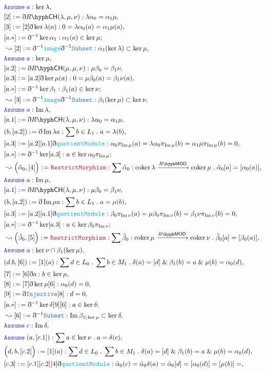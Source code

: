 \documentclass[12pt]{scrartcl}
\newcommand{\TYPE}[1]{\textcolor{NavyBlue}{\mathtt{#1}}}
\newcommand{\FUNC}[1]{\textcolor{Cerulean}{\mathtt{#1}}}
\newcommand{\LOGIC}[1]{\textcolor{Blue}{\mathtt{#1}}}
\newcommand{\THM}[1]{\textcolor{Maroon}{\mathtt{#1}}}
\renewcommand{\.}{\; . \;}
\newcommand{\de}{: \kern 0.1pc =}
\newcommand{\Page}[1]{ \begin{align*} #1 \end{align*}   }
\newcommand{ \bd }{ \ByDef }
\renewcommand{\And}{\; \& \;}
\DeclareMathOperator*{\im}{Im}
\newcommand{\Say}[3]{& #1 \de #2 : #3, \\}
\newcommand{\Conclude}[3]{& #1 \de #2 : #3; \\}
\newcommand{\Derive}[3]{& \leadsto #1 \de #2 : #3, \\}
\newcommand{\Assume}[2]{& \LOGIC{Assume} \; #1 : #2, \\}
\newcommand{\ByDef}{\eth}
\newcommand{\Arrow}[1]{\xrightarrow{#1}}
\DeclareMathOperator{\coker}{coker}
\newcommand{\LMOD}[1]{#1\hyph\mathsf{MOD}}
\newcommand{\CH}[1]{#1\hyph\mathsf{CH}}
\begin{document}
\Page{
	\Assume{a}{\ker \lambda}
	\Say{[2]}{\bd \CH{R}(\lambda,\mu,\nu)}{  \lambda \alpha_0 = \alpha_1 \mu  }
	\Say{[3]}{[2]\bd \ker \lambda (a)}{ 0 = \lambda \alpha_0(a) = \alpha_1 \mu(a)}
	\Conclude{[a.*]}{\bd^{-1}\ker \alpha_1}{ \alpha_1(a) \in \ker \mu}
	\Derive{[2]}{\bd^{-1}\FUNC{image}\bd^{-1}\TYPE{Subset}}{\alpha_1(\ker \lambda) \subset \ker \mu}
	\Assume{a}{\ker \mu}
	\Say{[a.2]}{\bd \CH{R}(\mu,\mu,\nu)}{  \mu \beta_0 = \beta_1 \nu  }
	\Say{[a.3]}{[a.2]\bd \ker \mu (a)}{ 0 = \mu \beta_0(a) = \beta_1 \nu(a)}
	\Conclude{[a.*]}{\bd^{-1}\ker \beta_1}{ \beta_1(a) \in \ker \nu}
	\Derive{[3]}{\bd^{-1}\FUNC{image}\bd^{-1}\TYPE{Subset}}{\beta_1(\ker \mu) \subset \ker \nu}
	\Assume{a}{\im \lambda}
	\Say{[a.1]}{\bd \CH{R}(\lambda,\mu,\nu)}{  \lambda \alpha_0 = \alpha_1 \mu  }
	\Say{(b,[a.2])}{\bd \im \lambda a}{\sum b \in L_1 \. a = \lambda(b) }
	\Say{[a.3]}{ [a.2][a.1] \bd \FUNC{quotientModule} }{ \alpha_0\pi_{\im \mu}(a) =  \lambda \alpha_0 \pi_{\im \mu}(b) =  \alpha_1 \mu \pi_{\im \mu}(b) = 0  }
	\Conclude{[a.*]}{\bd^{-1}\ker [a.3]}{ a \in \ker \alpha_0\pi_{\im \mu} }
	\Derive{\Big(\hat\alpha_0,[4]\Big)}{\THM{RestrictMorphism}}{\sum \hat \alpha_0 : \coker \lambda \Arrow{\LMOD{R}} \coker \mu \. \hat \alpha_0 [a] = [\alpha_0(a)]}
	\Assume{a}{\im \mu}
	\Say{[a.1]}{\bd \CH{R}(\lambda,\mu,\nu)}{  \mu \beta_0 = \beta_1 \nu  }
	\Say{(b,[a.2])}{\bd \im \mu a}{\sum b \in L_1 \. a = \mu(b) }
	\Say{[a.3]}{ [a.2][a.1] \bd \FUNC{quotientModule} }{ \beta_0\pi_{\im \nu}(a) =  \mu \beta_0 \pi_{\im \nu}(b) =  \beta_1 \nu \pi_{\im \nu}(b) = 0  }
	\Conclude{[a.*]}{\bd^{-1}\ker [a.3]}{ a \in \ker \beta_0\pi_{\im \nu} }
	\Derive{\Big(\hat\beta_0,[5]\Big)}{\THM{RestrictMorphism}}{\sum \hat \beta_0 : \coker \mu \Arrow{\LMOD{R}} \coker \nu \. \hat \beta_0 [a] = [\beta_0(a)]}
	\Assume{a}{\ker \nu \cap \beta_1(\ker \mu)}
	\Say{(d.b,[6])}{[1](a)}{\sum d \in L_0 \. \sum b \in M_1 \. \delta(a) = [d] \And \beta_1(b) = a \And \mu(b) = \alpha_0(d)  }
	\Say{[7]}{ [6]\bd a}{b \in \ker \mu}
	\Say{[8]}{[7]\bd \ker \mu[6] }{\alpha_0(d) = 0}
	\Say{[9]}{\bd \TYPE{Injective}[8]}{d = 0}
	\Conclude{[a.*]}{\bd^{-1}\ker \delta[9][6]}{a \in \ker \delta}
	\Derive{[6]}{\bd^{-1}\TYPE{Subset}}{\im \beta_{1|\ker \mu} \subset \ker \delta}
	\Assume{c}{\im \delta}
	\Assume{(a,[c.1])}{\sum a \in \ker \nu \. a = \delta(c)}
	\Say{\Big(d,b,[c.2]\Big)}{[1](a)}{\sum d \in L_0 \. \sum b \in M_1 \. \delta(a) = [d] \And \beta_1(b) = a \And \mu(b) = \alpha_0(d) }
	\Say{[c.3]}{ [c.1][c.2][4]\bd \FUNC{quotientModule}  }{ 
		\hat \alpha_0 (c) = 
		\hat \alpha_0 \delta (a) = 
		\hat \alpha_0 [d] = 
		[\alpha_0(d)] =
		[\mu(b)] = 
}}
\end{document}
